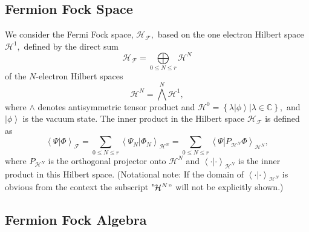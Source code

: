 \documentclass[aps,preprint]{revtex4}%
\begin{document}
\subsection{Fermion Fock Space \label{Fermi Fock Space}}

We consider the Fermi Fock space, $\mathcal{H}_{\mathcal{F}},$ based on the
one electron Hilbert space $\mathcal{H}^{1},$ defined by the direct sum
\begin{equation}
\mathcal{H}_{\mathcal{F}}=\underset{0\leq N\leq r}{\bigoplus}\mathcal{H}^{N}%
\end{equation}
of the $N$-electron Hilbert spaces
\begin{equation}
\mathcal{H}^{N}=\bigwedge\limits^{N}\mathcal{H}^{1},
\end{equation}
where $\wedge$ denotes antisymmetric tensor product and $\mathcal{H}%
^{0}=\left\{  \left.  \lambda\left\vert \phi\right\rangle \right\vert
\lambda\in\mathbb{C}\right\}  ,$ and $\left\vert \phi\right\rangle $ is the
vacuum state. The inner product in the Hilbert space $\mathcal{H}%
_{\mathcal{F}}$ is defined as
\begin{equation}
\left\langle \Psi\left\vert \Phi\right.  \right\rangle _{\mathcal{F}}%
=\sum_{0\leq N\leq r}\left\langle \Psi_{N}\left\vert \Phi_{N}\right.
\right\rangle _{\mathcal{H}^{N}}=\sum_{0\leq N\leq r}\left\langle
\Psi\left\vert P_{\mathcal{H}^{N}}\Phi\right.  \right\rangle _{\mathcal{H}%
^{N}},
\end{equation}
where $P_{\mathcal{H}^{N}}$ is the orthogonal projector onto $\mathcal{H}^{N}$
and $\left\langle \cdot\left\vert \cdot\right.  \right\rangle _{\mathcal{H}%
^{N}}$ is the inner product in this Hilbert space. (Notational note: If the
domain of $\left\langle \cdot\left\vert \cdot\right.  \right\rangle
_{\mathcal{H}^{N}}$ is obvious from the context the subscript "$\mathcal{H}%
^{N}"$ will not be explicitly shown.)

\subsection{Fermion Fock Algebra \label{Fermi Fock Alg}}
\end{document}
